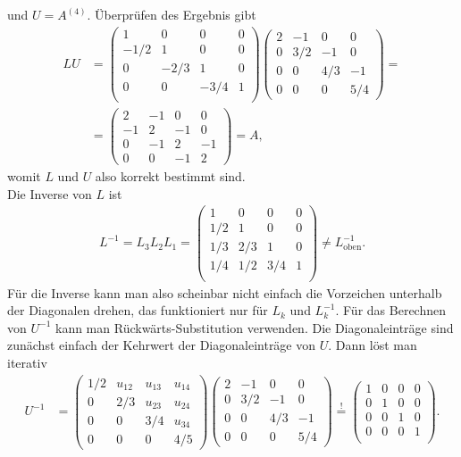 \documentclass[english, parskip=full]{scrartcl}
\newcommand{\tecxt}{}
\begin{document}
und $U = A^{(4)}$.
Überprüfen des Ergebnis gibt
\begin{align}
LU &= \begin{pmatrix}
1 & 0 & 0 & 0 \\
-1/2 & 1 & 0 & 0 \\
0 & -2/3 & 1 & 0 \\
0 & 0 & -3/4 & 1 \\
\end{pmatrix}\begin{pmatrix}
2 & -1 & 0 & 0 \\
0 & 3/2 & -1 & 0 \\
0 & 0 & 4/3 & -1 \\
0 & 0 & 0 & 5/4
\end{pmatrix} = \\
&= \begin{pmatrix}
2 & -1 & 0 & 0 \\
-1 & 2 & -1 & 0 \\
0 & -1 & 2 & -1 \\
0 & 0 & -1 & 2
\end{pmatrix} = A,
\end{align}
womit $L$ und $U$ also korrekt bestimmt sind.
\\
Die Inverse von $L$ ist
\begin{align}
L^{-1} = L_3L_2L_1 = \begin{pmatrix}
1 & 0 & 0 & 0 \\
1/2 & 1 & 0 & 0 \\
1/3 & 2/3 & 1 & 0 \\
1/4 & 1/2 & 3/4 & 1 \\
\end{pmatrix} \neq L_\tecxt\text{oben}^{-1}.
\end{align}
Für die Inverse kann man also scheinbar nicht einfach die Vorzeichen unterhalb der Diagonalen drehen, das funktioniert nur für $L_k$ und $L_k^{-1}$.
Für das Berechnen von $U^{-1}$ kann man Rückwärts-Substitution verwenden.
Die Diagonaleinträge sind zunächst einfach der Kehrwert der Diagonaleinträge von $U$.
Dann löst man iterativ
\begin{align}
U^{-1} &= \begin{pmatrix}
1/2 & u_{12} & u_{13} & u_{14} \\
0 & 2/3 & u_{23} & u_{24} \\
0 & 0 & 3/4 & u_{34}  \\
0 & 0 & 0 & 4/5
\end{pmatrix}\begin{pmatrix}
2 & -1 & 0 & 0 \\
0 & 3/2 & -1 & 0 \\
0 & 0 & 4/3 & -1 \\
0 & 0 & 0 & 5/4
\end{pmatrix} \overset{!}{=} \begin{pmatrix}
1 & 0 & 0 & 0 \\ 
0 & 1 & 0 & 0 \\
0 & 0 & 1 & 0 \\ 
0 & 0 & 0 & 1 \\
\end{pmatrix}.
\end{align}
\end{document}
